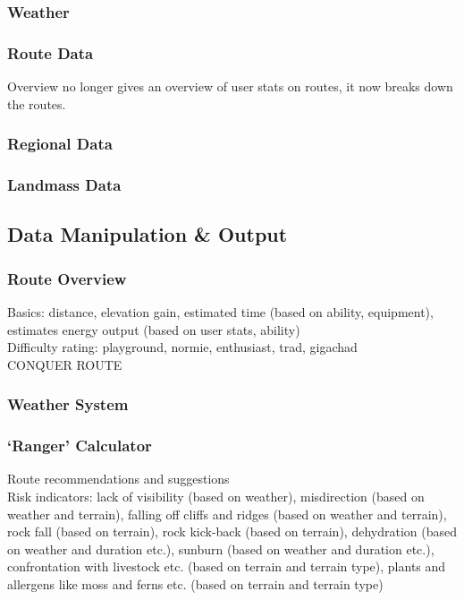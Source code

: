 \documentclass[11pt, english]{article}
\begin{document}
		\subsubsection{Weather}

		\subsubsection{Route Data}

		Overview no longer gives an overview of user stats on routes, it now breaks down the routes.

		\subsubsection{Regional Data}

		\subsubsection{Landmass Data}

	\subsection{Data Manipulation \& Output}

		\subsubsection{Route Overview}	
	
		Basics: distance, elevation gain, estimated time (based on ability, equipment), estimates energy output (based on user stats, ability)\\

		Difficulty rating: playground, normie, enthusiast, trad, gigachad\\

		CONQUER ROUTE

		\subsubsection{Weather System}

		\subsubsection{`Ranger' Calculator}

		Route recommendations and suggestions\\
		
		Risk indicators: lack of visibility (based on weather), misdirection (based on weather and terrain), falling off cliffs and ridges (based on weather and terrain), rock fall (based on terrain), rock kick-back (based on terrain), dehydration (based on weather and duration etc.), sunburn (based on weather and duration etc.), confrontation with livestock etc. (based on terrain and terrain type), plants and allergens like moss and ferns etc. (based on terrain and terrain type)\\
\end{document}

